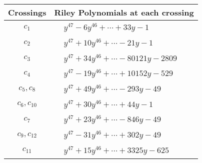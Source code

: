 \documentclass[1p]{elsarticle_modified}
\theoremstyle{definition}
\begin{document}
\begin{tabular}{m{50pt}|m{274pt}}
Crossings & \hspace{64pt}Riley Polynomials at each crossing \\
\hline $$\begin{aligned}c_{1}\end{aligned}$$&$\begin{aligned}
&y^{47}-6 y^{46}+\cdots+33 y-1
\end{aligned}$\\
\hline $$\begin{aligned}c_{2}\end{aligned}$$&$\begin{aligned}
&y^{47}+10 y^{46}+\cdots-21 y-1
\end{aligned}$\\
\hline $$\begin{aligned}c_{3}\end{aligned}$$&$\begin{aligned}
&y^{47}+34 y^{46}+\cdots-80121 y-2809
\end{aligned}$\\
\hline $$\begin{aligned}c_{4}\end{aligned}$$&$\begin{aligned}
&y^{47}-19 y^{46}+\cdots+10152 y-529
\end{aligned}$\\
\hline $$\begin{aligned}c_{5},c_{8}\end{aligned}$$&$\begin{aligned}
&y^{47}+49 y^{46}+\cdots-293 y-49
\end{aligned}$\\
\hline $$\begin{aligned}c_{6},c_{10}\end{aligned}$$&$\begin{aligned}
&y^{47}+30 y^{46}+\cdots+44 y-1
\end{aligned}$\\
\hline $$\begin{aligned}c_{7}\end{aligned}$$&$\begin{aligned}
&y^{47}+23 y^{46}+\cdots-846 y-49
\end{aligned}$\\
\hline $$\begin{aligned}c_{9},c_{12}\end{aligned}$$&$\begin{aligned}
&y^{47}-31 y^{46}+\cdots+302 y-49
\end{aligned}$\\
\hline $$\begin{aligned}c_{11}\end{aligned}$$&$\begin{aligned}
&y^{47}+15 y^{46}+\cdots+3325 y-625
\end{aligned}$\\
\hline
\end{tabular}\\~\\
\end{document}
